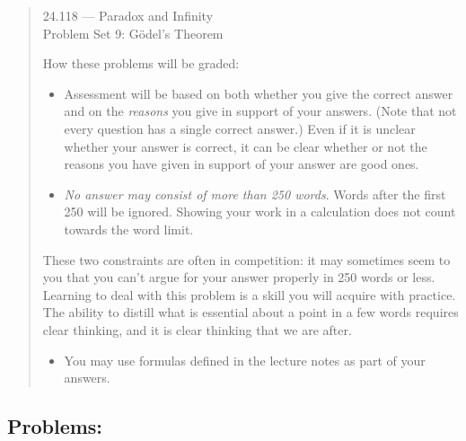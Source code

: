 \documentclass[12pt,a4paper]{article}
\begin{document}
\begin{quote}

\begin{center} {\large 24.118 --- Paradox and Infinity \\ \vspace{1mm}}
 {\large Problem Set 9: G\"odel's Theorem \\ \vspace{1mm}}
 
\end{center}
\vspace{3mm}

\noindent How these problems will be graded:

\begin{itemize} 

\item Assessment will be based on both whether you give the correct answer and on the \emph{reasons} you give in support of your answers. (Note that not every question has a single correct answer.) Even if it is unclear whether your answer is correct, it can be clear whether or not the reasons you have given in support of your answer are good ones. 

\item  \emph{No answer may consist of more than 250 words}. Words after the first 250 will be ignored. Showing your work in a calculation does not count towards the word limit.


\end{itemize} 

These two constraints are often in competition: it may sometimes seem to you that you can't argue for your answer properly in 250 words or less. Learning to deal with this problem is a skill you will acquire with practice. The ability to distill what is essential about a point in a few words requires clear thinking, and it is clear thinking that we are after.

\begin{itemize}

\item You may use formulas defined in the lecture notes as part of your answers.

\end{itemize}
\end{quote}


\vspace{3mm}


\subsection*{Problems:}
\end{document}
